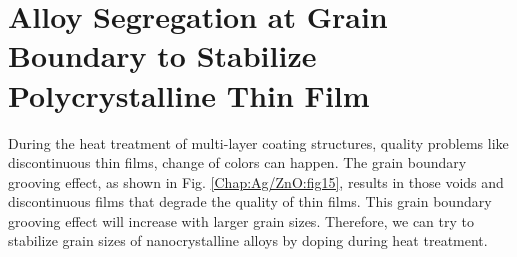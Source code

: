 \section{Alloy Segregation at Grain Boundary to Stabilize Polycrystalline  Thin Film}
\label{Chap:Ag/ZnO:GB}



During the heat treatment of multi-layer coating structures, quality problems like discontinuous thin films, change of colors can happen. The grain boundary grooving effect, as shown in Fig. \ref{Chap:Ag/ZnO:fig15}, results in those voids and discontinuous films that degrade the quality of thin films. \cite{mullins1957theory,simrick2012thermal} This grain boundary grooving effect will increase with larger grain sizes. \cite{martin2009thermal} Therefore, we can try to stabilize grain sizes of nanocrystalline alloys by doping during heat treatment. \cite{chookajorn2012design,jiao2018nanocrystalline}


